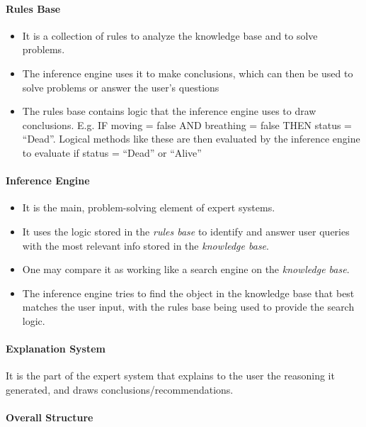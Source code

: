 \documentclass[../main.tex]{subfiles}
\begin{document}
\paragraph{Rules Base}

\begin{itemize}
    \item It is a collection of rules to analyze the knowledge base and to solve problems.
    \item The inference engine uses it to make conclusions, which can then be used to solve problems or answer the user’s questions
    \item The rules base contains logic that the inference engine uses to draw conclusions. E.g. IF moving = false AND breathing = false THEN status = “Dead”. Logical methods like these are then evaluated by the inference engine to evaluate if status = “Dead” or “Alive”
\end{itemize}

\paragraph{Inference Engine}

\begin{itemize}
    \item It is the main, problem-solving element of expert systems.
    \item It uses the logic stored in the \emph{rules base} to identify and answer user queries with the most relevant info stored in the \emph{knowledge base}.
    \item One may compare it as working like a search engine on the \emph{knowledge base}.
    \item The inference engine tries to find the object in the knowledge base that best matches the user input, with the rules base being used to provide the search logic.
\end{itemize}

\paragraph{Explanation System}

It is the part of the expert system that explains to the user the reasoning it generated, and draws conclusions/recommendations.

\paragraph{Overall Structure}
\end{document}
